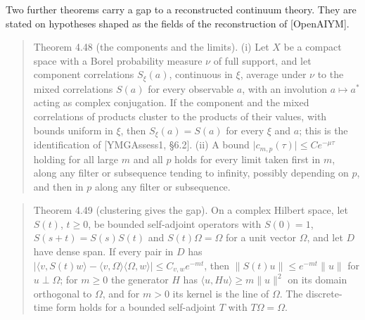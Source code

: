 \documentclass[10pt,letterpaper,twocolumn]{article}
\begin{document}
Two further theorems carry a gap to a reconstructed continuum theory. They are stated on hypotheses shaped as the fields of the reconstruction of {[}OpenAIYM{]}.

\begin{quote}
Theorem 4.48 (the components and the limits). (i) Let \(X\) be a compact space with a Borel probability measure \(\nu\) of full support, and let component correlations \(S_\xi(a)\), continuous in \(\xi\), average under \(\nu\) to the mixed correlations \(S(a)\) for every observable \(a\), with an involution \(a\mapsto a^*\) acting as complex conjugation. If the component and the mixed correlations of products cluster to the products of their values, with bounds uniform in \(\xi\), then \(S_\xi(a)=S(a)\) for every \(\xi\) and \(a\); this is the identification of {[}YMGAssess1, §6.2{]}. (ii) A bound \(\lvert c_{m,p}(\tau)\rvert\le Ce^{-\mu\tau}\) holding for all large \(m\) and all \(p\) holds for every limit taken first in \(m\), along any filter or subsequence tending to infinity, possibly depending on \(p\), and then in \(p\) along any filter or subsequence.
\end{quote}

\begin{quote}
Theorem 4.49 (clustering gives the gap). On a complex Hilbert space, let \(S(t)\), \(t\ge0\), be bounded self-adjoint operators with \(S(0)=1\), \(S(s+t)=S(s)S(t)\) and \(S(t)\Omega=\Omega\) for a unit vector \(\Omega\), and let \(D\) have dense span. If every pair in \(D\) has \(\lvert\langle v,S(t)w\rangle-\langle v,\Omega\rangle\langle\Omega,w\rangle\rvert\le C_{v,w}e^{-mt}\), then \(\lVert S(t)u\rVert\le e^{-mt}\lVert u\rVert\) for \(u\perp\Omega\); for \(m\ge0\) the generator \(H\) has \(\langle u,Hu\rangle\ge m\lVert u\rVert^2\) on its domain orthogonal to \(\Omega\), and for \(m>0\) its kernel is the line of \(\Omega\). The discrete-time form holds for a bounded self-adjoint \(T\) with \(T\Omega=\Omega\).
\end{quote}
\end{document}
